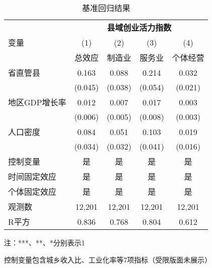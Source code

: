 \begin{table}[!htbp]
  \footnotesize
  \centering
  \caption{基准回归结果}\label{tab:baseline}
  \begin{threeparttable}
  \begin{tabular}{l*{4}{c}}
  \toprule
   & \multicolumn{4}{c}{\textbf{县域创业活力指数}} \\
  \cmidrule(lr){2-5}
  变量 & (1) & (2) & (3) & (4) \\
   & 总效应 & 制造业 & 服务业 & 个体经营 \\
  \midrule
  省直管县 & 0.163\tnote{***} & 0.088\tnote{**} & 0.214\tnote{***} & 0.032 \\
   & (0.045) & (0.038) & (0.054) & (0.021) \\
  地区GDP增长率 & 0.012\tnote{*} & 0.007 & 0.017\tnote{**} & 0.003 \\
   & (0.006) & (0.005) & (0.008) & (0.003) \\
  人口密度 & 0.084\tnote{**} & 0.051 & 0.103\tnote{**} & 0.019 \\
   & (0.034) & (0.032) & (0.041) & (0.016) \\
  \addlinespace[0.5ex]
  控制变量 & 是 & 是 & 是 & 是 \\
  时间固定效应 & 是 & 是 & 是 & 是 \\
  个体固定效应 & 是 & 是 & 是 & 是 \\
  \midrule
  观测数 & 12,201 & 12,201 & 12,201 & 12,201 \\
  R平方 & 0.836 & 0.768 & 0.804 & 0.612 \\
  \bottomrule
  \end{tabular}
  
  \begin{tablenotes}
  \scriptsize
  \item 注：***、**、*分别表示1%
  \item 控制变量包含城乡收入比、工业化率等7项指标（受限版面未展示）
  \end{tablenotes}
  \end{threeparttable}
  \end{table}
  